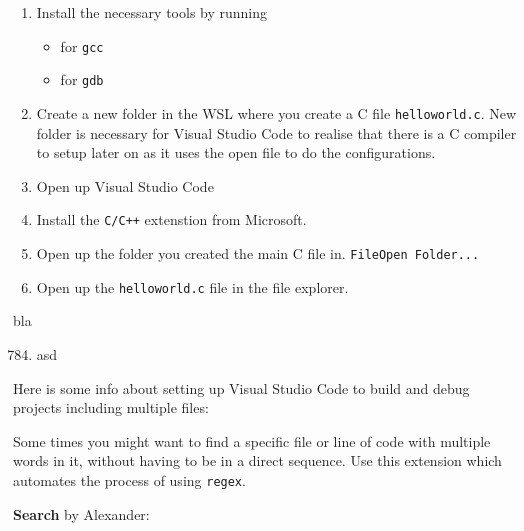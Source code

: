 
\begin{enumerate}
    \item Install the necessary tools by running
    \begin{itemize}
        \item {} for \texttt{gcc}
        \item {} for \texttt{gdb}
    \end{itemize}

    \item Create a new folder in the WSL where you create a C file \texttt{helloworld.c}. New folder is necessary for Visual Studio Code to realise that there is a C compiler to setup later on as it uses the open file to do the configurations.
    
    \item Open up Visual Studio Code
    
    \item Install the \texttt{C/C++} extenstion from Microsoft.
    
    \item Open up the folder you created the main C file in. \texttt{File\ra Open Folder...}
    
    \item Open up the \texttt{helloworld.c} file in the file explorer.
    
    
\end{enumerate}


bla


\begin{enumerate}
    \setcounter{enumi}{783}

    \item asd
\end{enumerate}





Here is some info about setting up Visual Studio Code to build and debug projects including multiple files:



Some times you might want to find a specific file or line of code with multiple words in it, without
having to be in a direct sequence. Use this extension which automates the process of using \texttt{regex}.

\textbf{Search} by Alexander:

